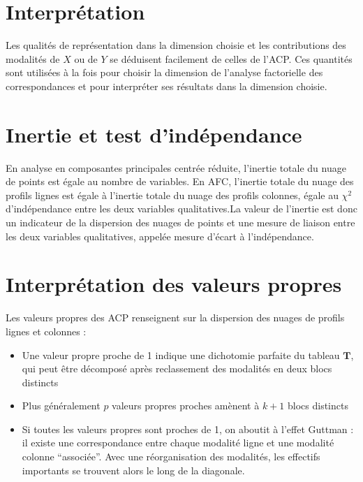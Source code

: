 \documentclass[letterpaper,10pt,english]{jupyterBook}
\begin{document}
\section{Interprétation}
\label{\detokenize{afc:interpretation}}
\sphinxAtStartPar
Les qualités de représentation dans la dimension choisie et les contributions
des modalités de \(X\) ou de \(Y\) se déduisent facilement de celles de l’ACP. Ces
quantités sont utilisées à la fois pour choisir la dimension de l’analyse factorielle des correspondances  et pour interpréter ses résultats dans la dimension choisie.


\section{Inertie et test d’indépendance}
\label{\detokenize{afc:inertie-et-test-d-independance}}
\sphinxAtStartPar
En analyse en composantes principales centrée réduite, l’inertie totale du nuage de points est  égale au nombre de variables. En AFC,  l’inertie totale du nuage des profils lignes est  égale à l’inertie totale du nuage des profils colonnes, égale au \(\chi^2\) d’indépendance entre les deux variables qualitatives.La valeur de l’inertie est donc un indicateur de la dispersion des nuages de points et une mesure de liaison entre les deux variables qualitatives,  appelée mesure d’écart à l’indépendance.


\section{Interprétation des valeurs propres}
\label{\detokenize{afc:interpretation-des-valeurs-propres}}
\sphinxAtStartPar
Les valeurs propres des ACP renseignent sur la dispersion des nuages de profils lignes et colonnes :
\begin{itemize}
\item {} 
\sphinxAtStartPar
Une valeur propre proche de 1 indique une dichotomie parfaite du tableau \(\mathbf T\), qui peut être décomposé après reclassement des modalités en deux blocs distincts

\item {} 
\sphinxAtStartPar
Plus généralement \(p\) valeurs propres proches amènent à \(k+1\) blocs distincts

\item {} 
\sphinxAtStartPar
Si toutes les valeurs propres sont proches de 1, on aboutit à l’effet Guttman : il existe une correspondance entre chaque modalité ligne et une modalité colonne “associée”. Avec une réorganisation des modalités, les effectifs importants se trouvent alors le long de la diagonale.

\end{itemize}
\end{document}
